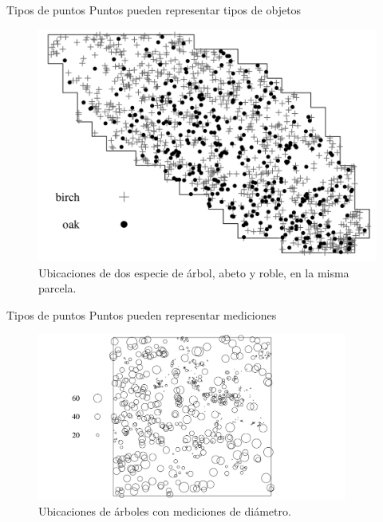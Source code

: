 \documentclass[
  11pt,
  ignorenonframetext,
]{beamer}
\begin{document}
\begin{frame}{Tipos de puntos}
\protect\hypertarget{tipos-de-puntos}{}
Puntos pueden representar tipos de objetos

\begin{figure}
\includegraphics[width=15.49in]{Figuras/Tipos-puntos} \caption{Ubicaciones de dos especie de árbol, abeto y roble, en la misma parcela.}\label{fig:tipos-puntos}
\end{figure}
\end{frame}

\begin{frame}{Tipos de puntos}
\protect\hypertarget{tipos-de-puntos-1}{}
Puntos pueden representar mediciones

\begin{figure}
\includegraphics[width=4in]{Figuras/Tipos-puntos-med} \caption{Ubicaciones de árboles con mediciones de diámetro.}\label{fig:tipos-puntos-2}
\end{figure}
\end{frame}
\end{document}

